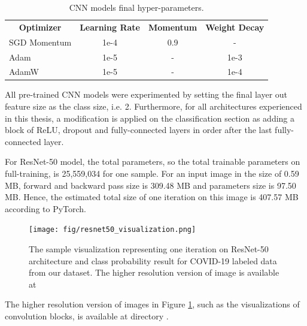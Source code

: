 \begin{table}[h]
\centering
\caption{CNN models final hyper-parameters.}
\label{tab:cnn_hyperparameters}
\begin{tabular}{lccc}
\multicolumn{1}{c}{\textbf{Optimizer}} & \textbf{Learning Rate} & \textbf{Momentum} & \textbf{Weight Decay} \\
SGD Momentum                           & 1e-4                   & 0.9               & -                     \\
Adam                                   & 1e-5                   & -                 & 1e-3                     \\
AdamW                                  & 1e-5                   & -                 & 1e-4                 
\end{tabular}
\end{table}

All pre-trained CNN models were experimented by setting the final layer out feature size as the class size, i.e. 2. Furthermore, for all architectures experienced in this thesis, a modification is applied on the classification section as adding a block of ReLU, dropout and fully-connected layers in order after the last fully-connected layer.

For ResNet-50 model, the total parameters, so the total trainable parameters on full-training, is 25,559,034 for one sample. For an input image in the size of 0.59 MB, forward and backward pass size is 309.48 MB and parameters size is 97.50 MB. Hence, the estimated total size of one iteration on this image is 407.57 MB according to PyTorch.

\begin{landscape}
\begin{figure}[h]
    \centering
    \texttt{[image: fig/resnet50\_visualization.png]}
    \vspace{1mm}
    \caption{The sample visualization representing one iteration on ResNet-50 architecture and class probability result for COVID-19 labeled data from our dataset. The higher resolution version of image is available at \\  }
    \label{fig:resnet50_visualization}
\end{figure}
\end{landscape}

The higher resolution version of images in Figure \ref{fig:resnet50_visualization}, such as the visualizations of convolution blocks, is available at directory .

